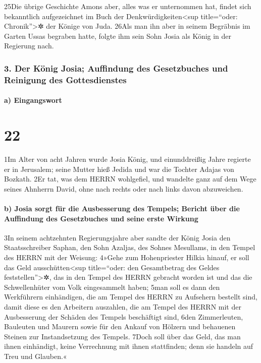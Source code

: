 25Die übrige Geschichte Amons aber, alles was er unternommen hat, findet
sich bekanntlich aufgezeichnet im Buch der Denkwürdigkeiten\textless sup
title=``oder: Chronik''\textgreater✲ der Könige von Juda. 26Als man ihn
aber in seinem Begräbnis im Garten Ussas begraben hatte, folgte ihm sein
Sohn Josia als König in der Regierung nach.

\hypertarget{der-kuxf6nig-josia-auffindung-des-gesetzbuches-und-reinigung-des-gottesdienstes}{%
\subsubsection{3. Der König Josia; Auffindung des Gesetzbuches und
Reinigung des
Gottesdienstes}\label{der-kuxf6nig-josia-auffindung-des-gesetzbuches-und-reinigung-des-gottesdienstes}}

\hypertarget{a-eingangswort}{%
\paragraph{a) Eingangswort}\label{a-eingangswort}}

\hypertarget{section-21}{%
\section{22}\label{section-21}}

1Im Alter von acht Jahren wurde Josia König, und einunddreißig Jahre
regierte er in Jerusalem; seine Mutter hieß Jedida und war die Tochter
Adajas von Bozkath. 2Er tat, was dem HERRN wohlgefiel, und wandelte ganz
auf dem Wege seines Ahnherrn David, ohne nach rechts oder nach links
davon abzuweichen.

\hypertarget{b-josia-sorgt-fuxfcr-die-ausbesserung-des-tempels-bericht-uxfcber-die-auffindung-des-gesetzbuches-und-seine-erste-wirkung}{%
\paragraph{b) Josia sorgt für die Ausbesserung des Tempels; Bericht über
die Auffindung des Gesetzbuches und seine erste
Wirkung}\label{b-josia-sorgt-fuxfcr-die-ausbesserung-des-tempels-bericht-uxfcber-die-auffindung-des-gesetzbuches-und-seine-erste-wirkung}}

3In seinem achtzehnten Regierungsjahre aber sandte der König Josia den
Staatsschreiber Saphan, den Sohn Azaljas, des Sohnes Mesullams, in den
Tempel des HERRN mit der Weisung: 4»Gehe zum Hohenpriester Hilkia
hinauf, er soll das Geld ausschütten\textless sup title=``oder: den
Gesamtbetrag des Geldes feststellen''\textgreater✲, das in den Tempel
des HERRN gebracht worden ist und das die Schwellenhüter vom Volk
eingesammelt haben; 5man soll es dann den Werkführern einhändigen, die
am Tempel des HERRN zu Aufsehern bestellt sind, damit diese es den
Arbeitern auszahlen, die am Tempel des HERRN mit der Ausbesserung der
Schäden des Tempels beschäftigt sind, 6den Zimmerleuten, Bauleuten und
Maurern sowie für den Ankauf von Hölzern und behauenen Steinen zur
Instandsetzung des Tempels. 7Doch soll über das Geld, das man ihnen
einhändigt, keine Verrechnung mit ihnen stattfinden; denn sie handeln
auf Treu und Glauben.«

